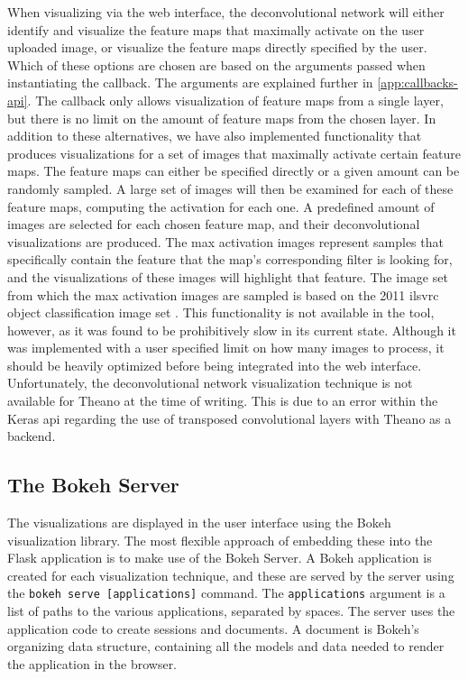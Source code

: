 \noindent When visualizing via the web interface, the deconvolutional network will either identify and visualize the feature maps that maximally activate on the user uploaded image, or visualize the feature maps directly specified by the user. Which of these options are chosen are based on the arguments passed when instantiating the callback. The arguments are explained further in \autoref{app:callbacks-api}. The callback only allows visualization of feature maps from a single layer, but there is no limit on the amount of feature maps from the chosen layer. In addition to these alternatives, we have also implemented functionality that produces visualizations for a set of images that maximally activate certain feature maps. The feature maps can either be specified directly or a given amount can be randomly sampled. A large set of images will then be examined for each of these feature maps, computing the activation for each one. A predefined amount of images are selected for each chosen feature map, and their deconvolutional visualizations are produced. The max activation images represent samples that specifically contain the feature that the map's corresponding filter is looking for, and the visualizations of these images will highlight that feature. The image set from which the max activation images are sampled is based on the 2011 \acrshort{ilsvrc} object classification image set \cite{imagenet}. This functionality is not available in the tool, however, as it was found to be prohibitively slow in its current state. Although it was implemented with a user specified limit on how many images to process, it should be heavily optimized before being integrated into the web interface. \\

\noindent Unfortunately, the deconvolutional network visualization technique is not available for Theano at the time of writing. This is due to an error within the Keras \acrshort{api} regarding the use of transposed convolutional layers with Theano as a backend.

\subsection{The Bokeh Server}

The visualizations are displayed in the user interface using the Bokeh visualization library. The most flexible approach of embedding these into the Flask application is to make use of the Bokeh Server. A Bokeh application is created for each visualization technique, and these are served by the server using the \texttt{bokeh serve [applications]} command. The \texttt{applications} argument is a list of paths to the various applications, separated by spaces. The server uses the application code to create sessions and documents. A document is Bokeh's organizing data structure, containing all the models and data needed to render the application in the browser.\\

